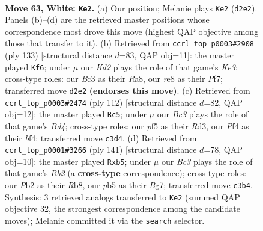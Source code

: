 \documentclass[11pt]{article}
\begin{document}
\begin{figure}[p]\centering
\begin{subfigure}{0.46\textwidth}\centering
\resizebox{\linewidth}{!}{%
\newchessgame
\chessboard[
  setfen={4rb2/5kp1/p1p4r/Pp1b1p1p/2p2P1P/2B1P1P1/1P1K3N/1R4R1 w - - 27 63},
  showmover=false,
  pgfstyle=straightmove, color=movearrow, markmove={d2-e2}
]}
\caption{}
\end{subfigure}\hfill
\begin{subfigure}{0.46\textwidth}\centering
\resizebox{\linewidth}{!}{%
\newchessgame
\chessboard[
  setfen={r7/5p2/1p1rk3/1B1p3p/P1pPp1bP/4P1P1/PR3P2/1R4K1 b - - 46 67},
  showmover=false,
  pgfstyle=straightmove, color=movearrow, markmove={e6-f6}
]}
\caption{}
\end{subfigure}
\\[4pt]
\begin{subfigure}{0.46\textwidth}\centering
\resizebox{\linewidth}{!}{%
\newchessgame
\chessboard[
  setfen={8/1p2rk2/p4p2/P2p2p1/1P1B1bPp/2PR4/2r2PP1/3R1K2 w - - 7 57},
  showmover=false,
  pgfstyle=straightmove, color=movearrow, markmove={d4-c5}
]}
\caption{}
\end{subfigure}\hfill
\begin{subfigure}{0.46\textwidth}\centering
\resizebox{\linewidth}{!}{%
\newchessgame
\chessboard[
  setfen={1r6/1r2pkb1/2Rp2p1/1P1P1p1p/n1B2P2/5KPP/1P3B2/1R6 b - - 0 71},
  showmover=false,
  pgfstyle=straightmove, color=movearrow, markmove={b7-b5}
]}
\caption{}
\end{subfigure}
\caption{\textbf{Move 63, White: \texttt{Ke2}.} (a) Our position; Melanie plays \texttt{Ke2} (\texttt{d2e2}). Panels (b)--(d) are the retrieved master positions whose correspondence most drove this move (highest QAP objective among those that transfer to it). (b) Retrieved from \texttt{ccrl\_top\_p0003\#2908} (ply 133) [structural distance $d$=83, QAP obj=11]: the master played \texttt{Kf6}; under $\mu$ our \emph{Kd2} plays the role of that game's \emph{Ke3}; cross-type roles: our \emph{B}c3 as their \emph{R}a8, our \emph{r}e8 as their \emph{P}f7; transferred move \texttt{d2e2} \textbf{(endorses this move)}. (c) Retrieved from \texttt{ccrl\_top\_p0003\#2474} (ply 112) [structural distance $d$=82, QAP obj=12]: the master played \texttt{Bc5}; under $\mu$ our \emph{Bc3} plays the role of that game's \emph{Bd4}; cross-type roles: our \emph{p}f5 as their \emph{R}d3, our \emph{P}f4 as their \emph{b}f4; transferred move \texttt{c3d4}. (d) Retrieved from \texttt{ccrl\_top\_p0001\#3266} (ply 141) [structural distance $d$=78, QAP obj=10]: the master played \texttt{Rxb5}; under $\mu$ our \emph{Bc3} plays the role of that game's \emph{Rb2} (a \textbf{cross-type} correspondence); cross-type roles: our \emph{P}b2 as their \emph{R}b8, our \emph{p}b5 as their \emph{B}g7; transferred move \texttt{c3b4}. Synthesis: 3 retrieved analogs transferred to \texttt{Ke2} (summed QAP objective 32, the strongest correspondence among the candidate moves); Melanie committed it via the \texttt{search} selector.}
\label{fig:thought-m124}
\end{figure}
\end{document}
